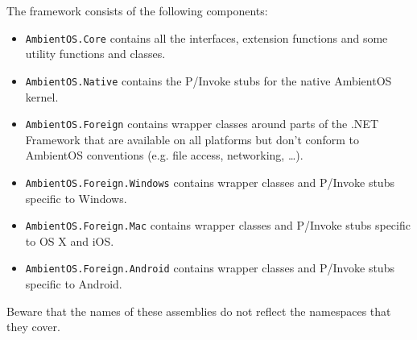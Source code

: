 \documentclass[a4paper]{article}
\begin{document}
The framework consists of the following components:

\begin{itemize}
  \item {\tt AmbientOS.Core} contains all the interfaces, extension functions and some utility functions and classes.
  \item {\tt AmbientOS.Native} contains the P/Invoke stubs for the native AmbientOS kernel.
  \item {\tt AmbientOS.Foreign} contains wrapper classes around parts of the .NET Framework that are available on all platforms but don't conform to AmbientOS conventions (e.g. file access, networking, \ldots).
  \item {\tt AmbientOS.Foreign.Windows} contains wrapper classes and P/Invoke stubs specific to Windows.
  \item {\tt AmbientOS.Foreign.Mac} contains wrapper classes and P/Invoke stubs specific to OS X and iOS.
  \item {\tt AmbientOS.Foreign.Android} contains wrapper classes and P/Invoke stubs specific to Android.
\end{itemize}

Beware that the names of these assemblies do not reflect the namespaces that they cover.
\end{document}
